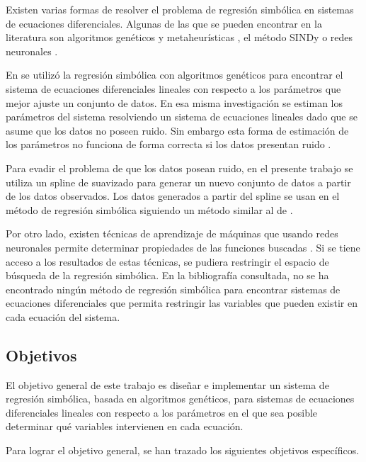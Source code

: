 Existen varias formas de resolver el problema de regresión simbólica en sistemas de ecuaciones diferenciales. Algunas de las que se pueden encontrar en la literatura son algoritmos genéticos y metaheurísticas \cite{koza1994genetic, schmidt2013eureqa}, el método SINDy \cite{brunton2016discovering} o redes neuronales \cite{udrescu2020ai}.

En \cite{iba2008inference} se utilizó la regresión simbólica con algoritmos genéticos para encontrar el sistema de ecuaciones diferenciales lineales con respecto a los parámetros que mejor ajuste un conjunto de datos. En esa misma investigación se estiman los parámetros del sistema resolviendo un sistema de ecuaciones lineales dado que se asume que los datos no poseen ruido. Sin embargo esta forma de estimación de los parámetros no funciona de forma correcta si los datos presentan ruido \cite{essays2019ordinary}.

Para evadir el problema de que los datos posean ruido, en el presente trabajo se utiliza un spline de suavizado \cite{green1993nonparametric} para generar un nuevo conjunto de datos a partir de los datos observados. Los datos generados a partir del spline se usan en el método de regresión simbólica siguiendo un método similar al de \cite{iba2008inference}.

Por otro lado, existen técnicas de aprendizaje de máquinas que usando redes neuronales permite determinar propiedades de las funciones buscadas \cite{udrescu2020ai}. Si se tiene acceso a los resultados de estas técnicas, se pudiera restringir el espacio de búsqueda de la regresión simbólica. En la bibliografía consultada, no se ha encontrado ningún método de regresión simbólica para encontrar sistemas de ecuaciones diferenciales que permita restringir las variables que pueden existir en cada ecuación del sistema.


\subsection*{Objetivos}

El objetivo general de este trabajo es diseñar e implementar un sistema de regresión simbólica, basada en algoritmos genéticos, para sistemas de ecuaciones diferenciales lineales con respecto a los parámetros en el que sea posible determinar qué variables intervienen en cada ecuación.

Para lograr el objetivo general, se han trazado los siguientes objetivos específicos.

